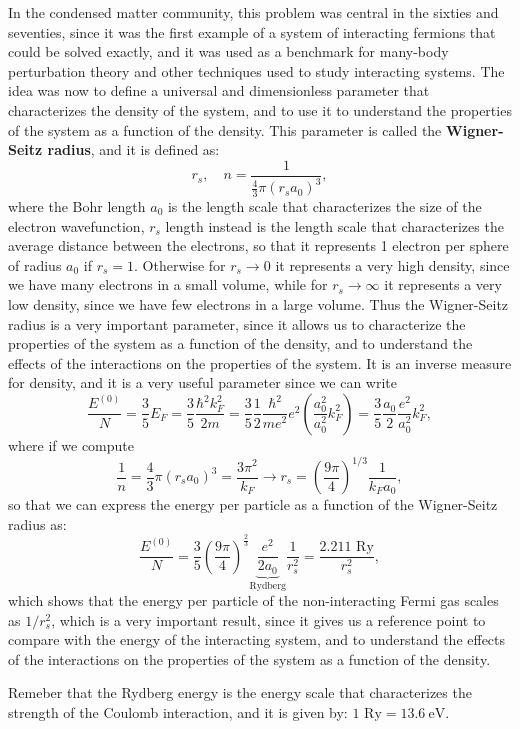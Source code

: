 In the condensed matter community, this problem was central in the sixties and seventies, since it was the first example of a system of interacting fermions that could be solved exactly, and it was used as a benchmark for many-body perturbation theory and other techniques used to study interacting systems. The idea was now to define a universal and dimensionless parameter that characterizes the density of the system, and to use it to understand the properties of the system as a function of the density. This parameter is called the \textbf{Wigner-Seitz radius}, and it is defined as:
\[
    r_s, \quad n = \frac{1}{\tfrac{4}{3} \pi (r_s a_0)^3},
\]
where the Bohr length \(a_0\) is the length scale that characterizes the size of the electron wavefunction, \(r_s\) length instead is the length scale that characterizes the average distance between the electrons, so that it represents 1 electron per sphere of radius \(a_0\) if \(r_s = 1\). Otherwise for \(r_s \to 0\) it represents a very high density, since we have many electrons in a small volume, while for \(r_s \to \infty\) it represents a very low density, since we have few electrons in a large volume. Thus the Wigner-Seitz radius is a very important parameter, since it allows us to characterize the properties of the system as a function of the density, and to understand the effects of the interactions on the properties of the system. It is an inverse measure for density, and it is a very useful parameter since we can write
\[
    \frac{E^{(0)}}{N} = \frac{3}{5} E_F = \frac{3}{5} \frac{\hbar^2 k_F^2}{2m} = \frac{3}{5} \frac{1}{2} \frac{\hbar^2}{m e^2} e^2 \left( \frac{a_0^2}{a_0^2} k_F^2 \right) = \frac{3}{5} \frac{a_0}{2} \frac{e^2}{a_0^2} k_F^2,
\]
where if we compute
\[
    \frac{1}{n} = \frac{4}{3} \pi (r_s a_0)^3 = \frac{3 \pi^2}{k_F} \to r_s = \left( \frac{9 \pi}{4} \right)^{1/3} \frac{1}{k_F a_0},
\]
so that we can express the energy per particle as a function of the Wigner-Seitz radius as:
\[
    \frac{E^{(0)}}{N} = \frac{3}{5} \left( \frac{9 \pi}{4} \right)^{\tfrac{2}{3}} \underbrace{\frac{e^2}{2a_0}}_{\text{Rydberg}} \frac{1}{r_s^2} = \frac{2.211 \text{ Ry}}{r_s^2},
\]
which shows that the energy per particle of the non-interacting Fermi gas scales as \(1/r_s^2\), which is a very important result, since it gives us a reference point to compare with the energy of the interacting system, and to understand the effects of the interactions on the properties of the system as a function of the density.

Remeber that the Rydberg energy is the energy scale that characterizes the strength of the Coulomb interaction, and it is given by: \(1 \text{ Ry} = \SI{13.6}{\electronvolt}\).


